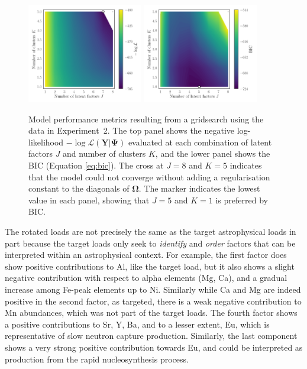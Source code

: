 \documentclass[twocolumn]{aastex62}
\newcommand{\vect}[1]{\boldsymbol{\mathbf{#1}}}
\renewcommand{\vec}[1]{\vect{#1}}
\newcommand{\data}{\textbf{Y}}
\newcommand{\scorecovs}{\vec\Omega}
\begin{document}
\begin{figure}
	\includegraphics[width=0.45\textwidth]{experiments/exp2-gridsearch-ll.png}
	\includegraphics[width=0.45\textwidth]{experiments/exp2-gridsearch-bic.png}
    \caption{Model performance metrics resulting from a gridsearch using the
    		 \citet{Barklem:2005} data in Experiment~2.
    		 The top panel shows the negative log-likelihood 
			 $-\log{\mathcal{L}\left(\data|\vec\Psi\right)}$ 
			 evaluated at each combination of latent factors $J$ and number 
			 of clusters $K$, and the lower panel shows the BIC (Equation \ref{eq:bic}).
			 The cross at
			 $J=8$ and $K=5$ indicates that the model could not converge without
			 adding a regularisation constant to the diagonals of $\scorecovs$.
			 The marker indicates the lowest value in each panel, showing that
			 $J = 5$ and $K = 1$ is preferred by BIC.}
    \label{fig:exp2-gridsearch-contours}
\end{figure}


The rotated loads are not precisely the same as the target astrophysical loads
in part because the target loads only seek to \emph{identify} and \emph{order}
factors that can be interpreted within an astrophysical context. For example,
the first factor does show positive contributions to Al, like the target load,
but it also shows a slight negative contribution with respect to alpha elements
(Mg, Ca), and a gradual increase among Fe-peak elements up to Ni. Similarly while
Ca and Mg are indeed positive in the second factor, as targeted, there is a
weak negative contribution to Mn abundances, which was not part of the target
loads. The fourth factor shows a positive contributions to Sr, Y, Ba, and to a
lesser extent, Eu, which is representative of slow neutron capture production.
Similarly, the last component shows a very strong positive contribution towards
Eu, and could be interpreted as production from the rapid nucleosynthesis process.
\end{document}
